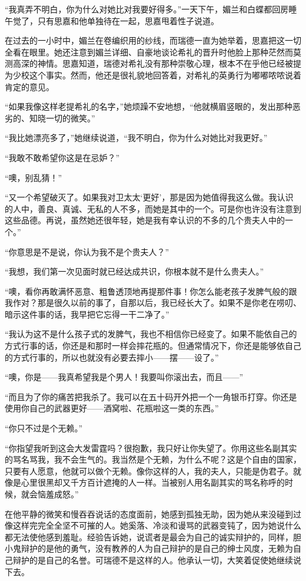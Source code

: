 \par “我真弄不明白，你为什么对她比对我要好得多。”一天下午，媚兰和白蝶都回房睡午觉了，只有思嘉和他单独待在一起，思嘉甩着性子说道。
\par 在过去的一小时中，媚兰在卷编织用的纱线，而瑞德一直为她举着，思嘉把这一切全看在眼里。她还注意到媚兰详细、自豪地谈论希礼的晋升时他脸上那种茫然而莫测高深的神情。思嘉知道，瑞德对希礼没有那种崇敬心理，根本不在乎他已经被提为少校这个事实。然而，他还是很礼貌地回答着，对希礼的英勇行为嘟嘟哝哝说着肯定的意见。
\par “如果我像这样老提希礼的名字，”她烦躁不安地想，“他就横眉竖眼的，发出那种恶劣的、知晓一切的微笑。”
\par “我比她漂亮多了，”她继续说道，“我不明白，你为什么对她比对我更好。”
\par “我敢不敢希望你这是在忌妒？”
\par “噢，别乱猜！”
\par “又一个希望破灭了。如果我对卫太太‘更好’，那是因为她值得我这么做。我认识的人中，善良、真诚、无私的人不多，而她是其中的一个。可是你也许没有注意到这些品德。再说，虽然她还很年轻，她是我有幸认识的不多的几个贵夫人中的一个。”
\par “你意思是不是说，你认为我不是个贵夫人？”
\par “我想，我们第一次见面时就已经达成共识，你根本就不是什么贵夫人。”
\par “噢，看你再敢满怀恶意、粗鲁透顶地再提那件事！你怎么能老孩子发脾气般的跟我作对？那是很久以前的事了，自那以后，我已经长大了。如果不是你老在唠叨、暗示这件事的话，我早把它忘得一干二净了。”
\par “我认为这不是什么孩子式的发脾气，我也不相信你已经变了。如果不能依自己的方式行事的话，你还是和那时一样会摔花瓶的。但通常情况下，你还是能够依自己的方式行事的，所以也就没有必要去摔小——摆——设了。”
\par “噢，你是——我真希望我是个男人！我要叫你滚出去，而且——”
\par “而且为了你的痛苦把我杀了。我可以在五十码开外把一个一角银币打穿。你还是使用你自己的武器更好——酒窝啦、花瓶啦这一类的东西。”
\par “你只不过是个无赖。”
\par “你指望我听到这会大发雷霆吗？很抱歉，我只好让你失望了。你用这些名副其实的骂名骂我，我不会生气的。我当然是个无赖，为什么不呢？这是个自由的国家，只要有人愿意，他就可以做个无赖。像你这样的人，我的夫人，只能是伪君子。就像是心里很黑却又千方百计遮掩的人一样。当被别人用名副其实的骂名称呼的时候，就会恼羞成怒。”
\par 在他平静的微笑和慢吞吞说话的态度面前，她感到孤独无助，因为她从来没碰到过像这样完完全全坚不可摧的人。她奚落、冷淡和谩骂的武器变钝了，因为她说什么都无法使他感到羞耻。经验告诉她，说谎者是最会为自己的诚实辩护的，同样，胆小鬼辩护的是他的勇气，没有教养的人为自己辩护的是自己的绅士风度，无赖为自己辩护的是自己的名誉。可瑞德不是这样的人。他承认一切，大笑着促使她继续说下去。
